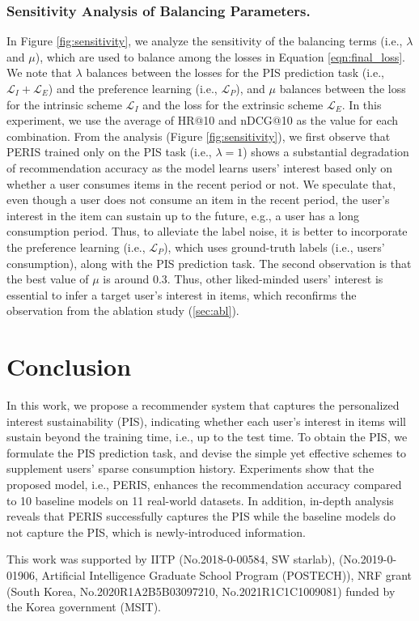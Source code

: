 \documentclass[sigconf]{acmart}
\newcommand{\MD}{{\small\textsf{PERIS}}}
\begin{document}
\subsubsection{\textbf{Sensitivity Analysis of Balancing Parameters.}}
In Figure \ref{fig:sensitivity}, we analyze the sensitivity of the balancing terms (i.e., $\lambda$ and $\mu$), which are used to balance among the losses in Equation \ref{eqn:final_loss}. We note that $\lambda$ balances between the losses for the PIS prediction task (i.e., $\mathcal{L}_I + \mathcal{L}_E$) and the preference learning (i.e., $\mathcal{L}_P$), and $\mu$ balances between the loss for the intrinsic scheme $\mathcal{L}_I $ and the loss for the extrinsic scheme $\mathcal{L}_E$. 
In this experiment, we use the average of HR@10 and nDCG@10 as the value for each combination. 
From the analysis (Figure \ref{fig:sensitivity}), we first observe that \MD{} trained only on the PIS task (i.e., $\lambda=1$) shows a substantial degradation of recommendation accuracy as the model learns users' interest based only on whether a user consumes items in the recent period or not. We speculate that, even though a user does not consume an item in the recent period, the user's interest in the item can sustain up to the future, e.g., a user has a long consumption period. Thus, to alleviate the label noise, it is better  to incorporate the preference learning (i.e., $\mathcal{L}_P$), which uses ground-truth labels (i.e., users' consumption), along with the PIS prediction task. The second observation is that the best value of $\mu$ is around 0.3. Thus, other liked-minded users' interest is essential to infer a target user's interest in items, which reconfirms the observation from the ablation study (\cref{sec:abl}).




\section{Conclusion}
In this work, we propose a recommender system that captures the personalized interest sustainability (PIS), indicating whether each user's interest in items will sustain beyond the training time, i.e., up to the test time. To obtain the PIS, we formulate the PIS prediction task, and devise the simple yet effective schemes to supplement users' sparse consumption history. 
Experiments show that the proposed model, i.e., \MD{}, enhances the recommendation accuracy compared to 10 baseline models on 11 real-world datasets. In addition, in-depth analysis reveals that \MD{} successfully captures the PIS while the baseline models do not capture the PIS, which is newly-introduced information. 


\begin{acks}
This work was supported by IITP (No.2018-0-00584, SW starlab), (No.2019-0-01906, Artificial Intelligence Graduate School Program (POSTECH)), NRF grant (South Korea, No.2020R1A2B5B03097210, No.2021R1C1C1009081) funded by the Korea government (MSIT).
\end{acks}





\balance


\newpage
\end{document}
